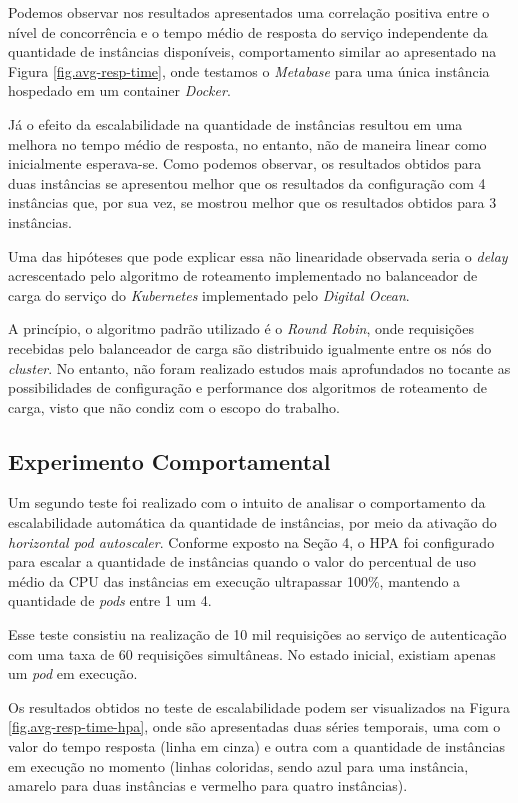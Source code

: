 Podemos observar nos resultados apresentados uma correlação positiva entre o nível de concorrência e o tempo médio de resposta do serviço independente da quantidade de instâncias disponíveis, comportamento similar ao apresentado na Figura \ref{fig.avg-resp-time}, onde testamos o \textit{Metabase} para uma única instância hospedado em um container \textit{Docker}. 

Já o efeito da escalabilidade na quantidade de instâncias resultou em uma melhora no tempo médio de resposta, no entanto, não de maneira linear como inicialmente esperava-se. Como podemos observar, os resultados obtidos para duas instâncias se apresentou melhor que os resultados da configuração com 4 instâncias que, por sua vez, se mostrou melhor que os resultados obtidos para 3 instâncias. 

Uma das hipóteses que pode explicar essa não linearidade observada seria o \textit{delay} acrescentado pelo algoritmo de roteamento implementado no balanceador de carga do serviço do \textit{Kubernetes} implementado pelo \textit{Digital Ocean}. 

A princípio, o algoritmo padrão utilizado é o \textit{Round Robin}, onde requisições recebidas pelo balanceador de carga são distribuido igualmente entre os nós do \textit{cluster}. No entanto, não foram realizado estudos mais aprofundados no tocante as possibilidades de configuração e performance dos algoritmos de roteamento de carga, visto que não condiz com o escopo do trabalho.

\subsection{Experimento Comportamental}

Um segundo teste foi realizado com o intuito de analisar o comportamento da escalabilidade automática da quantidade de instâncias, por meio da ativação do \textit{horizontal pod autoscaler}. Conforme exposto na Seção 4, o HPA foi configurado para escalar a quantidade de instâncias quando o valor do percentual de uso médio da CPU das instâncias em execução ultrapassar 100\%, mantendo a quantidade de \textit{pods} entre 1 um 4. 

Esse teste consistiu na realização de 10 mil requisições ao serviço de autenticação com uma taxa de 60 requisições simultâneas. No estado inicial, existiam apenas um \textit{pod} em execução. 

Os resultados obtidos no teste de escalabilidade podem ser visualizados na Figura \ref{fig.avg-resp-time-hpa}, onde são apresentadas duas séries temporais, uma com o valor do tempo resposta (linha em cinza) e outra com a quantidade de instâncias em execução no momento (linhas coloridas, sendo azul para uma instância, amarelo para duas instâncias e vermelho para quatro instâncias).

